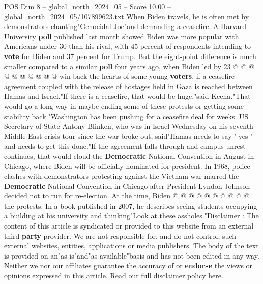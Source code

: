 \begin{textsample}{POS Dim 8 – global\_north\_2024\_05 – Score 10.00 – global\_north\_2024\_05/107899623.txt}
When Biden travels, he is often met by demonstrators chanting"Genocidal Joe"and demanding a ceasefire.
A Harvard University \textbf{poll} published last month showed Biden was more popular with Americans under 30 than his rival, with 45 percent of respondents intending to \textbf{vote} for Biden and 37 percent for Trump.
But the eight-point difference is much smaller compared to a similar \textbf{poll} four years ago, when Biden led by 23 @ @ @ @ @ @ @ @ @ @ win back the hearts of some young \textbf{voters}, if a ceasefire agreement coupled with the release of hostages held in Gaza is reached between Hamas and Israel."If there is a ceasefire, that would be huge,"said Keena."That would go a long way in maybe ending some of these protests or getting some stability back."Washington has been pushing for a ceasefire deal for weeks.
US Secretary of State Antony Blinken, who was in Israel Wednesday on his seventh Middle East crisis tour since the war broke out, said"Hamas needs to say ' yes ' and needs to get this done."If the agreement falls through and campus unrest continues, that would cloud the \textbf{Democratic} National Convention in August in Chicago, where Biden will be officially nominated for president.
In 1968, police clashes with demonstrators protesting against the Vietnam war marred the \textbf{Democratic} National Convention in Chicago after President Lyndon Johnson decided not to run for re-election.
At the time, Biden @ @ @ @ @ @ @ @ @ @ the protests.
In a book published in 2007, he describes seeing students occupying a building at his university and thinking"Look at these assholes."Disclaimer : The content of this article is syndicated or provided to this website from an external third \textbf{party} provider.
We are not responsible for, and do not control, such external websites, entities, applications or media publishers.
The body of the text is provided on an"as is"and"as available"basis and has not been edited in any way.
Neither we nor our affiliates guarantee the accuracy of or \textbf{endorse} the views or opinions expressed in this article.
Read our full disclaimer policy here.

\end{textsample}
